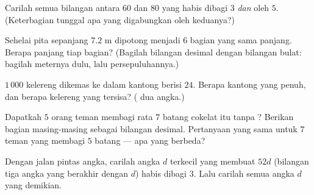 \begin{exercise}[$\star$]\label{exo:g5:division:7}
Carilah semua bilangan antara $60$ dan $80$ yang habis dibagi $3$
\emph{dan} oleh $5$. (Keterbagian tunggal apa yang digabungkan oleh
keduanya?)
\end{exercise}

\begin{exercise}[$\star$]\label{exo:g5:division:8}
Sehelai pita sepanjang $7.2$ m dipotong menjadi $6$ bagian yang sama
panjang. Berapa panjang tiap bagian? (Bagilah bilangan desimal
dengan bilangan bulat: bagilah meternya dulu, lalu persepuluhannya.)
\end{exercise}

\begin{exercise}[$\star$]\label{exo:g5:division:9}
$1\,000$ kelereng dikemas ke dalam kantong berisi $24$. Berapa
kantong yang penuh, dan berapa kelereng yang tersisa? ( dua angka.)
\end{exercise}

\begin{exercise}[$\star\star$]\label{exo:g5:division:10}
Dapatkah $5$ orang teman membagi rata $7$ batang cokelat itu tanpa
?
Berikan bagian masing-masing sebagai bilangan desimal. Pertanyaan
yang sama untuk $7$ teman yang membagi $5$ batang --- apa yang berbeda?
\end{exercise}

\begin{exercise}[$\star\star$]\label{exo:g5:division:11}
Dengan jalan pintas  angka, carilah angka $d$ terkecil yang
membuat $52d$ (bilangan tiga angka yang berakhir dengan $d$) habis
dibagi $3$. Lalu carilah semua angka $d$ yang demikian.

\end{exercise}
